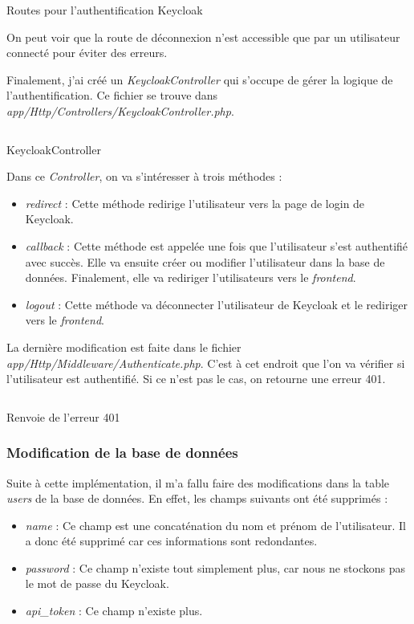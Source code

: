 \begin{listing}[H]
    \inputminted{php}{assets/code/routeKeycloak.php}
    \caption{Routes pour l'authentification Keycloak \label{routeKeycloak}}
\end{listing}

On peut voir que la route de déconnexion n'est accessible que par un utilisateur connecté pour éviter des erreurs.

Finalement, j'ai créé un \emph{KeycloakController} qui s'occupe de gérer la logique de l'authentification. Ce fichier se trouve dans \emph{app/Http/Controllers/KeycloakController.php}.

\begin{listing}[H]
    \inputminted{php}{assets/code/keycloakController.php}
    \caption{KeycloakController \label{keycloakController}}
\end{listing}

Dans ce \emph{Controller}, on va s'intéresser à trois méthodes :
\begin{itemize}
    \item \emph{redirect} : Cette méthode redirige l'utilisateur vers la page de login de Keycloak.
    \item \emph{callback} : Cette méthode est appelée une fois que l'utilisateur s'est authentifié avec succès. Elle va ensuite créer ou modifier l'utilisateur dans la base de données. Finalement, elle va rediriger l'utilisateurs vers le \emph{frontend}.
    \item \emph{logout} : Cette méthode va déconnecter l'utilisateur de Keycloak et le rediriger vers le \emph{frontend}.
\end{itemize}

La dernière modification est faite dans le fichier \emph{app/Http/Middleware/Authenticate.php}. C'est à cet endroit que l'on va vérifier si l'utilisateur est authentifié. Si ce n'est pas le cas, on retourne une erreur 401.

\begin{listing}[H]
    \inputminted{php}{assets/code/authenticate.php}
    \caption{Renvoie de l'erreur 401 \label{authenticate}}
\end{listing}


\subsubsection{Modification de la base de données}
Suite à cette implémentation, il m'a fallu faire des modifications dans la table \emph{users} de la base de données. En effet, les champs suivants ont été supprimés :
\begin{itemize}
    \item \emph{name} : Ce champ est une concaténation du nom et prénom de l'utilisateur. Il a donc été supprimé car ces informations sont redondantes.
    \item \emph{password} : Ce champ n'existe tout simplement plus, car nous ne stockons pas le mot de passe du Keycloak.
    \item \emph{api\_token} : Ce champ n'existe plus.
\end{itemize}

